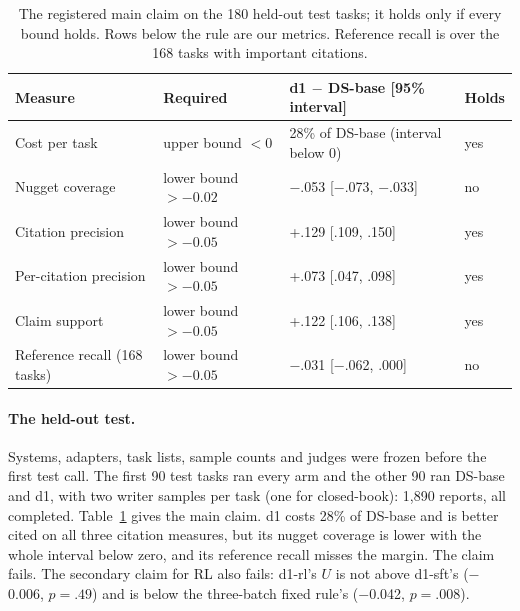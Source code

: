 \documentclass[11pt, letterpaper]{article}
\newcommand{\n}{$-$}
\begin{document}
\begin{table}[t]
\centering\small
\begin{tabular}{llll}
\toprule
Measure & Required & d1 $-$ DS-base [95\% interval] & Holds\\
\midrule
Cost per task & upper bound $< 0$ & 28\% of DS-base (interval below 0) & yes\\
Nugget coverage & lower bound $> -0.02$ & \n.053 [\n.073, \n.033] & no\\
Citation precision & lower bound $> -0.05$ & +.129 [.109, .150] & yes\\
\midrule
Per-citation precision & lower bound $> -0.05$ & +.073 [.047, .098] & yes\\
Claim support & lower bound $> -0.05$ & +.122 [.106, .138] & yes\\
Reference recall (168 tasks) & lower bound $> -0.05$ & \n.031 [\n.062, .000] & no\\
\bottomrule
\end{tabular}
\caption{The registered main claim on the 180 held-out test tasks; it holds only if every bound
holds. Rows below the rule are our metrics. Reference recall is over the 168 tasks with important
citations.}
\label{tab:claim}
\end{table}

\paragraph{The held-out test.} Systems, adapters, task lists, sample counts and judges were frozen
before the first test call. The first 90 test tasks ran every arm and the other 90 ran DS-base and
d1, with two writer samples per task (one for closed-book): 1,890 reports, all completed.
Table~\ref{tab:claim} gives the main claim. d1 costs 28\% of DS-base and is better cited on all three
citation measures, but its nugget coverage is lower with the whole interval below zero, and its
reference recall misses the margin. The claim fails. The secondary claim for RL also fails: d1-rl's
$U$ is not above d1-sft's ($-$0.006, $p = .49$) and is below the three-batch fixed rule's ($-$0.042,
$p = .008$).
\end{document}
